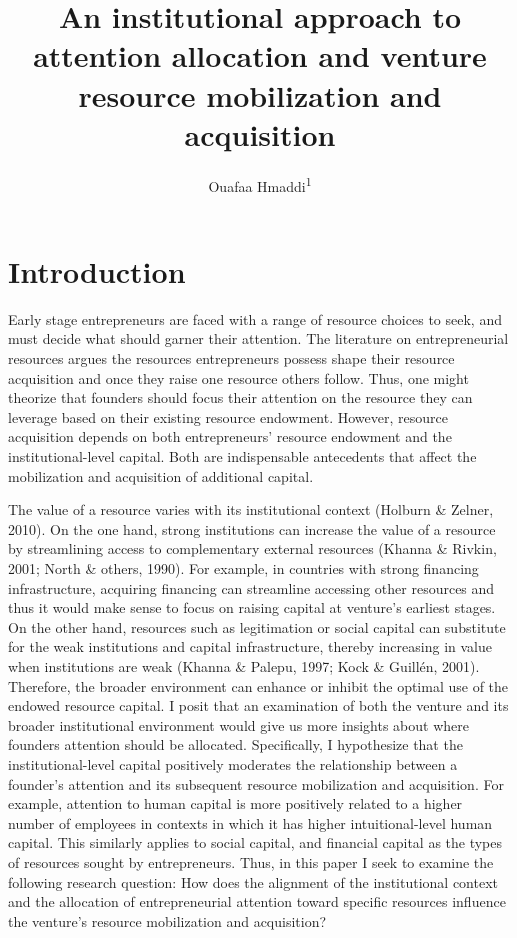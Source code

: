 \documentclass[
  english,
  man]{apa6}
\title{An institutional approach to attention allocation and venture resource mobilization and acquisition}
\author{Ouafaa Hmaddi\textsuperscript{1}}
\date{}
\affiliation{\vspace{0.5cm}\textsuperscript{1} University of Oregon}
\begin{document}
\maketitle

\hypertarget{introduction}{%
\section{Introduction}\label{introduction}}

Early stage entrepreneurs are faced with a range of resource choices to seek, and must decide what should garner their attention. The literature on entrepreneurial resources argues the resources entrepreneurs possess shape their resource acquisition and once they raise one resource others follow. Thus, one might theorize that founders should focus their attention on the resource they can leverage based on their existing resource endowment. However, resource acquisition depends on both entrepreneurs' resource endowment and the institutional-level capital. Both are indispensable antecedents that affect the mobilization and acquisition of additional capital.

The value of a resource varies with its institutional context (Holburn \& Zelner, 2010). On the one hand, strong institutions can increase the value of a resource by streamlining access to complementary external resources (Khanna \& Rivkin, 2001; North \& others, 1990). For example, in countries with strong financing infrastructure, acquiring financing can streamline accessing other resources and thus it would make sense to focus on raising capital at venture's earliest stages. On the other hand, resources such as legitimation or social capital can substitute for the weak institutions and capital infrastructure, thereby increasing in value when institutions are weak (Khanna \& Palepu, 1997; Kock \& Guillén, 2001). Therefore, the broader environment can enhance or inhibit the optimal use of the endowed resource capital. I posit that an examination of both the venture and its broader institutional environment would give us more insights about where founders attention should be allocated. Specifically, I hypothesize that the institutional-level capital positively moderates the relationship between a founder's attention and its subsequent resource mobilization and acquisition. For example, attention to human capital is more positively related to a higher number of employees in contexts in which it has higher intuitional-level human capital. This similarly applies to social capital, and financial capital as the types of resources sought by entrepreneurs. Thus, in this paper I seek to examine the following research question: How does the alignment of the institutional context and the allocation of entrepreneurial attention toward specific resources influence the venture's resource mobilization and acquisition?
\end{document}
